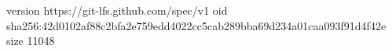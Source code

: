 version https://git-lfs.github.com/spec/v1
oid sha256:42d0102af88c2bfa2e759edd4022cc5cab289bba69d234a01caa093f91d4f42e
size 11048
